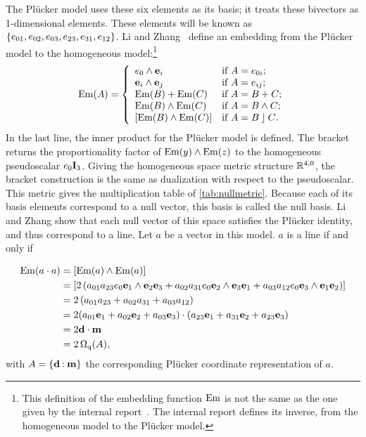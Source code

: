 The Pl\"ucker model uses these six elements as its basis; it treats these bivectors as 1-dimensional elements.  These elements will be known as $\{e_{01}, e_{02}, e_{03}, e_{23}, e_{31}, e_{12}\}$.  Li and Zhang~\cite{Hongbo} define an embedding from the Pl\"ucker model to the homogeneous model:\footnote{This definition of the embedding function $\operatorname{Em}$ is not the same as the one given by the internal report~\cite{internal}.  The internal report defines its inverse, from the homogeneous model to the Pl\"ucker model.}
\begin{equation} \label{eq:Em}
  \operatorname{Em}(A) = \left\{ 
    \begin{array}{ll}
      e_0 \wedge \mathbf{e}_i &\mbox{if $A = e_{0i}$}; \\
      \mathbf{e}_i \wedge \mathbf{e}_j &\mbox{if $A = e_{ij}$}; \\
      \operatorname{Em}(B) + \operatorname{Em}(C) &\mbox{if $A = B + C$}; \\
      \operatorname{Em}(B) \wedge \operatorname{Em}(C) &\mbox{if $A = B \wedge C$}; \\
      \left[\operatorname{Em}(B) \wedge \operatorname{Em}(C)\right] &\mbox{if $A = B \mathbin{\rfloor} C$}. \\
    \end{array}
    \right.
\end{equation}
In the last line, the inner product for the Pl\"ucker model is defined.  The bracket returns the proportionality factor of $\operatorname{Em}(y) \wedge \operatorname{Em}(z)$ to the homogeneous pseudoscalar $e_0\mathbf{I}_3$.  Giving the homogeneous space metric structure $\mathbb{R}^{4,0}$, the bracket construction is the same as dualization with respect to the pseudoscalar.  This metric gives the multiplication table of \autoref{tab:nullmetric}.  Because each of its basis elements correspond to a null vector, this basis is called the null basis.  Li and Zhang show that each null vector of this space satisfies the Pl\"ucker identity, and thus correspond to a line.  Let $a$ be a vector in this model.  $a$ is a line if and only if

\begin{align*}
  \operatorname{Em}(a \mathbin{\cdot} a) &= \left[\operatorname{Em}(a) \wedge \operatorname{Em}(a)\right] \\
    &= \left[ 2 \left( a_{01} a_{23} e_0\mathbf{e}_1 \wedge \mathbf{e}_2\mathbf{e}_3 + a_{02} a_{31} e_0\mathbf{e}_2 \wedge \mathbf{e}_3\mathbf{e}_1 + a_{03} a_{12} e_0\mathbf{e}_3 \wedge \mathbf{e}_1\mathbf{e}_2 \right) \right] \\
    &= 2 \left( a_{01} a_{23} + a_{02} a_{31} + a_{03} a_{12} \right) \\
    &= 2 (a_{01} \mathbf{e}_1 + a_{02} \mathbf{e}_2 + a_{03} \mathbf{e}_3) \mathbin{\cdot} (a_{23} \mathbf{e}_1 + a_{31} \mathbf{e}_2 + a_{23} \mathbf{e}_3) \\
    &= 2 \mathbf{d} \mathbin{\cdot} \mathbf{m} \\ 
    &= 2 \operatorname{\Omega_q}(A),
\end{align*}
with $A = \{\mathbf{d} \mathbin{:} \mathbf{m}\}$ the corresponding Pl\"ucker coordinate representation of $a$.


